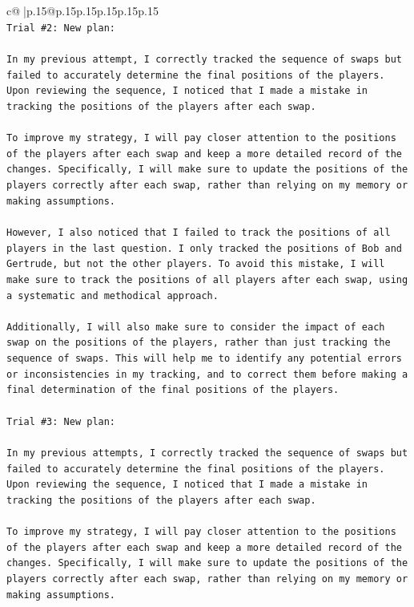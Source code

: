 \documentclass{article}
\begin{document}
{\begin{supertabular}{c@{$\;$}|p{.15\linewidth}@{}p{.15\linewidth}p{.15\linewidth}p{.15\linewidth}p{.15\linewidth}p{.15\linewidth}}
{{{\\ 
\texttt{Trial \#2: New plan: } \\
\\ 
\texttt{In my previous attempt, I correctly tracked the sequence of swaps but failed to accurately determine the final positions of the players. Upon reviewing the sequence, I noticed that I made a mistake in tracking the positions of the players after each swap. } \\
\\ 
\texttt{To improve my strategy, I will pay closer attention to the positions of the players after each swap and keep a more detailed record of the changes. Specifically, I will make sure to update the positions of the players correctly after each swap, rather than relying on my memory or making assumptions. } \\
\\ 
\texttt{However, I also noticed that I failed to track the positions of all players in the last question. I only tracked the positions of Bob and Gertrude, but not the other players. To avoid this mistake, I will make sure to track the positions of all players after each swap, using a systematic and methodical approach. } \\
\\ 
\texttt{Additionally, I will also make sure to consider the impact of each swap on the positions of the players, rather than just tracking the sequence of swaps. This will help me to identify any potential errors or inconsistencies in my tracking, and to correct them before making a final determination of the final positions of the players.} \\
\\ 
\texttt{Trial \#3: New plan: } \\
\\ 
\texttt{In my previous attempts, I correctly tracked the sequence of swaps but failed to accurately determine the final positions of the players. Upon reviewing the sequence, I noticed that I made a mistake in tracking the positions of the players after each swap. } \\
\\ 
\texttt{To improve my strategy, I will pay closer attention to the positions of the players after each swap and keep a more detailed record of the changes. Specifically, I will make sure to update the positions of the players correctly after each swap, rather than relying on my memory or making assumptions. } \\
\\ 
}}}
\end{supertabular}}
\end{document}
